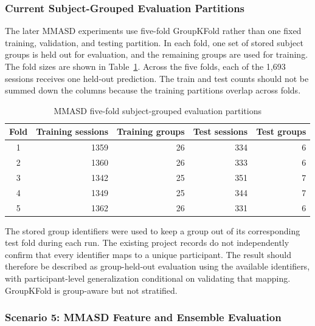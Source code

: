 \documentclass[a4paper,12pt]{report}
\begin{document}
\subsubsection*{Current Subject-Grouped Evaluation Partitions}

The later MMASD experiments use five-fold GroupKFold rather than one fixed training, validation, and testing partition. In each fold, one set of stored subject groups is held out for evaluation, and the remaining groups are used for training. The fold sizes are shown in Table~\ref{tab:mmasd_cv_partitions}. Across the five folds, each of the 1,693 sessions receives one held-out prediction. The train and test counts should not be summed down the columns because the training partitions overlap across folds.

\begin{table}[htbp]
\centering
\small
\caption{MMASD five-fold subject-grouped evaluation partitions}
\label{tab:mmasd_cv_partitions}
\begin{tabular}{|c|r|r|r|r|}
\hline
\textbf{Fold} & \textbf{Training sessions} & \textbf{Training groups} & \textbf{Test sessions} & \textbf{Test groups} \\
\hline
1 & 1359 & 26 & 334 & 6 \\
2 & 1360 & 26 & 333 & 6 \\
3 & 1342 & 25 & 351 & 7 \\
4 & 1349 & 25 & 344 & 7 \\
5 & 1362 & 26 & 331 & 6 \\
\hline
\end{tabular}
\end{table}

The stored group identifiers were used to keep a group out of its corresponding test fold during each run. The existing project records do not independently confirm that every identifier maps to a unique participant. The result should therefore be described as group-held-out evaluation using the available identifiers, with participant-level generalization conditional on validating that mapping. GroupKFold is group-aware but not stratified.

\subsubsection*{Scenario 5: MMASD Feature and Ensemble Evaluation}
\end{document}
